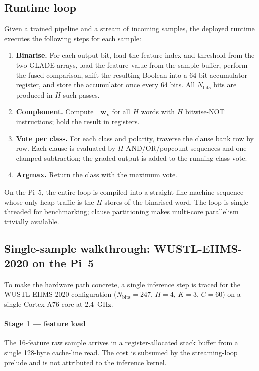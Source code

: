 \documentclass[journal,10pt]{IEEEtran}
\begin{document}
\subsection{Runtime loop}
\label{sec:hw-runtime}

Given a trained pipeline and a stream of incoming samples, the
deployed runtime executes the following steps for each sample:

\begin{enumerate}
  \item \textbf{Binarise.} For each output bit, load the feature
        index and threshold from the two GLADE arrays, load the
        feature value from the sample buffer, perform the fused
        comparison, shift the resulting Boolean into a 64-bit
        accumulator register, and store the accumulator once every
        64 bits. All $N_\text{bits}$ bits are produced in $H$ such
        passes.
  \item \textbf{Complement.} Compute $\neg\mathbf{w}_\mathbf{x}$ for
        all $H$ words with $H$ bitwise-NOT instructions; hold the
        result in registers.
  \item \textbf{Vote per class.} For each class and polarity,
        traverse the clause bank row by row. Each clause is evaluated
        by $H$ AND/OR/popcount sequences and one clamped subtraction;
        the graded output is added to the running class vote.
  \item \textbf{Argmax.} Return the class with the maximum vote.
\end{enumerate}

On the Pi~5, the entire loop is compiled into a straight-line machine
sequence whose only heap traffic is the $H$ stores of the binarised
word. The loop is single-threaded for benchmarking; clause
partitioning makes multi-core parallelism trivially available.

\subsection{Single-sample walkthrough: WUSTL-EHMS-2020 on the Pi~5}
\label{sec:hw-walkthrough}

To make the hardware path concrete, a single inference step is traced
for the WUSTL-EHMS-2020 configuration ($N_\text{bits}=247$, $H=4$,
$K=3$, $C=60$) on a single Cortex-A76 core at 2.4~GHz.

\paragraph{Stage 1 --- feature load}
The 16-feature raw sample arrives in a register-allocated stack
buffer from a single 128-byte cache-line read. The cost is
subsumed by the streaming-loop prelude and is not attributed to the
inference kernel.
\end{document}
